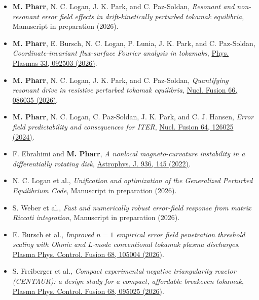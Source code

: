 \documentclass{rpires}
\begin{document}
\begin{resume}
\begin{itemize}  \itemsep -2pt %
    \item {{\bf M. Pharr}, N. C. Logan, J. K. Park, and C. Paz-Soldan, \textit{Resonant and non-resonant error field effects in drift-kinetically perturbed tokamak equilibria}, Manuscript in preparation (2026).}
    \item {{\bf M. Pharr}, E. Bursch, N. C. Logan, P. Lunia, J. K. Park, and C. Paz-Soldan, \textit{Coordinate-invariant flux-surface Fourier analysis in tokamaks}, \href{https://doi.org/10.1063/5.0346311}{Phys. Plasmas 33, 092503 (2026)}.}
    \item {{\bf M. Pharr}, N. C. Logan, J. K. Park, and C. Paz-Soldan, \textit{Quantifying resonant drive in resistive perturbed tokamak equilibria}, \href{https://doi.org/10.1088/1741-4326/ae7616}{Nucl. Fusion 66, 086035 (2026)}.}
    \item {{\bf M. Pharr}, N. C. Logan, C. Paz-Soldan, J. K. Park, and C. J. Hansen, \textit{Error field predictability and consequences for ITER}, \href{https://doi.org/10.1088/1741-4326/ad7ed6}{Nucl. Fusion 64, 126025 (2024)}.}
    \item {F. Ebrahimi and {\bf M. Pharr}, \textit{A nonlocal magneto-curvature instability in a differentially rotating disk}, \href{https://doi.org/10.3847/1538-4357/ac892d}{Astrophys. J. 936, 145 (2022)}.}\vspace{0.5cm}
    \item {N. C. Logan et al., \textit{Unification and optimization of the Generalized Perturbed Equilibrium Code}, Manuscript in preparation (2026).}
    \item {S. Weber et al., \textit{Fast and numerically robust error-field response from matrix Riccati integration}, Manuscript in preparation (2026).}
    \item {E. Bursch et al., \textit{Improved $n=1$ empirical error field penetration threshold scaling with Ohmic and L-mode conventional tokamak plasma discharges}, \href{https://doi.org/10.1088/1361-6587/aea7d6}{Plasma Phys. Control. Fusion 68, 105004 (2026)}.}
    \item {S. Freiberger et al., \textit{Compact experimental negative triangularity reactor (CENTAUR): a design study for a compact, affordable breakeven tokamak}, \href{https://doi.org/10.1088/1361-6587/ae9eea}{Plasma Phys. Control. Fusion 68, 095025 (2026)}.}

\end{itemize}
\end{resume}
\end{document}
